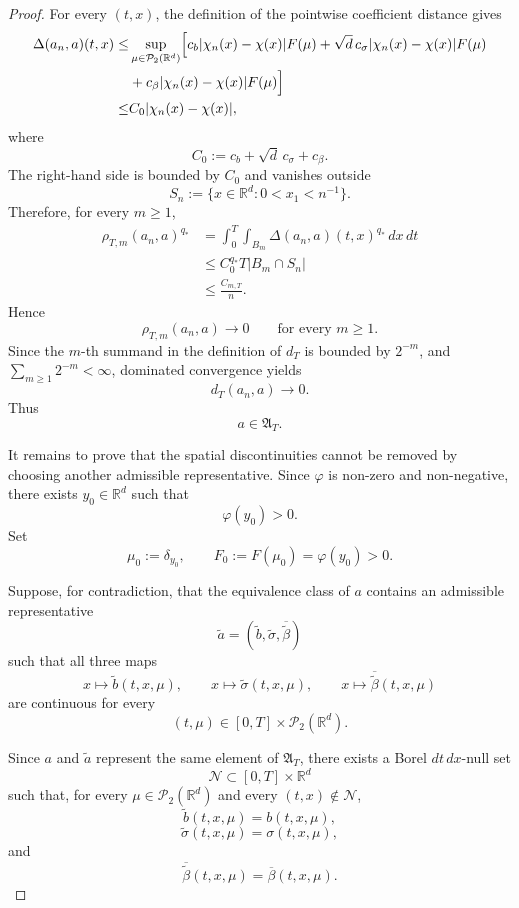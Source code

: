 \documentclass[12pt,oneside, reqno]{amsart}
\numberwithin{equation}{section}
\begin{document}
\begin{proof}
		
		For every $(t,x)$, the definition of the pointwise coefficient
		distance gives
		\[
		\begin{aligned}
			\Delta(a_n,a)(t,x)
			\leq&
			\sup_{\mu\in\mathcal P_2(\mathbb R^d)}
			\Bigl[
			c_b|\chi_n(x)-\chi(x)|F(\mu)
			+
			\sqrt d\,c_\sigma
			|\chi_n(x)-\chi(x)|F(\mu)
			\\
			&+
			c_\beta|\chi_n(x)-\chi(x)|F(\mu)
			\Bigr]
			\\
			\leq&
			C_0|\chi_n(x)-\chi(x)|,
		\end{aligned}
		\]
		where
		\[
		C_0:=c_b+\sqrt d\,c_\sigma+c_\beta.
		\]
		The right-hand side is bounded by $C_0$ and vanishes outside
		\[
		S_n
		:=
		\{x\in\mathbb R^d:0<x_1<n^{-1}\}.
		\]
		Therefore, for every $m\geq1$,
		\begin{equation}
			\label{eq:example-local-convergence}
			\begin{aligned}
				\rho_{T,m}(a_n,a)^{q_\ast}
				&=
				\int_0^T\int_{B_m}
				\Delta(a_n,a)(t,x)^{q_\ast}\,dx\,dt
				\\
				&\leq
				C_0^{q_\ast}T
				|B_m\cap S_n|
				\\
				&\leq
				\frac{C_{m,T}}{n}.
			\end{aligned}
		\end{equation}
		Hence
		\[
		\rho_{T,m}(a_n,a)\longrightarrow0
		\qquad
		\text{for every }m\geq1.
		\]
		Since the \(m\)-th summand in the definition of \(d_T\) is bounded by
		\(2^{-m}\), and \(\sum_{m\geq1}2^{-m}<\infty\), dominated convergence yields
		\[
		d_T(a_n,a)\longrightarrow0.
		\]
		Thus
		\[
		a\in\mathfrak A_T.
		\]
		
		It remains to prove that the spatial discontinuities cannot be
		removed by choosing another admissible representative. Since
		$\varphi$ is non-zero and non-negative, there exists
		$y_0\in\mathbb R^d$ such that
		\[
		\varphi(y_0)>0.
		\]
		Set
		\[
		\mu_0:=\delta_{y_0},
		\qquad
		F_0:=F(\mu_0)=\varphi(y_0)>0.
		\]
		
		Suppose, for contradiction, that the equivalence class of $a$
		contains an admissible representative
		\[
		\widetilde a
		=
		(\widetilde b,\widetilde\sigma,
		\overline{\widetilde\beta})
		\]
		such that all three maps
		\[
		x\longmapsto\widetilde b(t,x,\mu),
		\qquad
		x\longmapsto\widetilde\sigma(t,x,\mu),
		\qquad
		x\longmapsto
		\overline{\widetilde\beta}(t,x,\mu)
		\]
		are continuous for every
		\[
		(t,\mu)\in[0,T]\times\mathcal P_2(\mathbb R^d).
		\]
		
		Since $a$ and $\widetilde a$ represent the same element of
		$\mathfrak A_T$, there exists a Borel $dt\,dx$-null set
		\[
		\mathcal N\subset[0,T]\times\mathbb R^d
		\]
		such that, for every
		$\mu\in\mathcal P_2(\mathbb R^d)$ and every
		$(t,x)\notin\mathcal N$,
		\[
		\widetilde b(t,x,\mu)=b(t,x,\mu),
		\]
		\[
		\widetilde\sigma(t,x,\mu)=\sigma(t,x,\mu),
		\]
		and
		\[
		\overline{\widetilde\beta}(t,x,\mu)
		=
		\overline\beta(t,x,\mu).
		\]
		

\end{proof}
\end{document}

